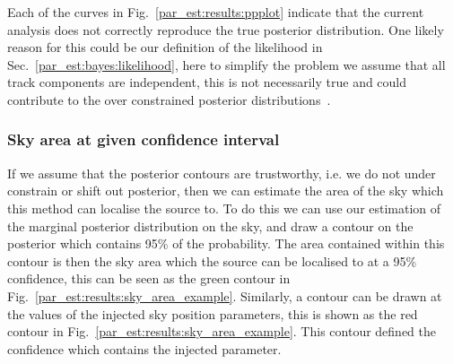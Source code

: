 Each of the curves in Fig.~\ref{par_est:results:ppplot} indicate that the
current analysis does not correctly reproduce the true posterior distribution.
One likely reason for this could be our definition of the likelihood in
Sec.~\ref{par_est:bayes:likelihood}, here to simplify the problem we assume
that all track components are independent, this is not necessarily true and
could contribute to the over constrained posterior
distributions~. 

%
%
\subsubsection{\label{par_est:results:simulations:skyarea}Sky area at given confidence interval}
%
%

If we assume that the posterior contours are trustworthy, i.e. we do not under constrain or
shift out posterior, then we can estimate the area of the sky which this method can
localise the source to.  To do this we can use our estimation of the marginal
posterior distribution on the sky, and draw a contour on the posterior which
contains 95\% of the probability.  The area contained within this contour is
then the sky area which the source can be localised to at a 95\% confidence,
this can be seen as the green contour in
Fig.~\ref{par_est:results:sky_area_example}.  Similarly, a contour can be drawn
at the values of the injected sky position parameters, this is shown as the red contour in
Fig.~\ref{par_est:results:sky_area_example}. 
This contour defined the confidence which contains the injected parameter.

